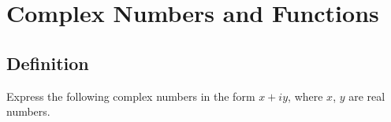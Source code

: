 \chapter{\textbf{Complex Numbers and Functions}}

\section{Definition}

\begin{exercise}
    Express the following complex numbers in the form $x+iy$, where $x$, $y$ are real numbers.
\end{exercise}